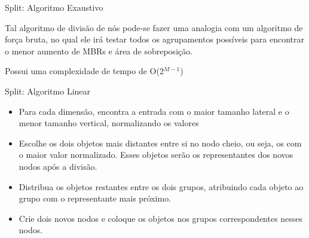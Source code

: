 \documentclass[compress,aspectratio=169]{beamer}
\begin{document}
\begin{frame}{Split: Algoritmo Exaustivo}
    \begin{justify}
        \item Tal algoritmo de divisão de nós pode-se fazer uma analogia com um algoritmo de força bruta, no qual ele irá testar todos os agrupamentos possíveis para encontrar o menor aumento de MBRs e área de sobreposição.
        \item Possui uma complexidade de tempo de O(2$^{M-1}$)
    \end{justify}
\end{frame}

\begin{frame}{Split: Algoritmo Linear}
    \begin{justify}
        \begin{itemize}
            \item Para cada dimensão, encontra a entrada com o maior tamanho lateral e o menor tamanho vertical, normalizando os valores 
        
            \item Escolhe os dois objetos mais distantes entre si no nodo cheio, ou seja, os com o maior valor normalizado. Esses objetos serão os representantes dos novos nodos após a divisão.

            \item Distribua os objetos restantes entre os dois grupos, atribuindo cada objeto ao grupo com o representante mais próximo.

            \item Crie dois novos nodos e coloque os objetos nos grupos correspondentes nesses nodos.
        \end{itemize}
    \end{justify}
\end{frame}
\end{document}
